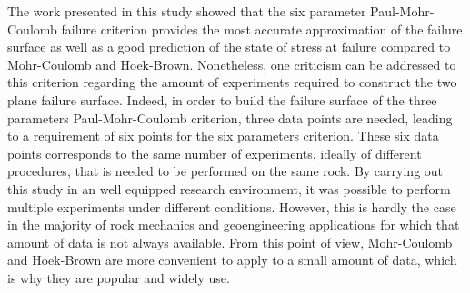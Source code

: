 The work presented in this study showed that the six parameter Paul-Mohr-Coulomb failure criterion provides the most accurate approximation of the failure surface as well as a good prediction of the state of stress at failure compared to Mohr-Coulomb and Hoek-Brown. Nonetheless, one criticism can be addressed to this criterion regarding the amount of experiments required to construct the two plane failure surface. Indeed, in order to build the failure surface of the three parameters Paul-Mohr-Coulomb criterion, three data points are needed, leading to a requirement of six points for the six parameters criterion. These six data points corresponds to the same number of experiments, ideally of different procedures, that is needed to be performed on the same rock. By carrying out this study in an well equipped research environment, it was possible to perform multiple experiments under different conditions. However, this is hardly the case in the majority of rock mechanics and geoengineering applications for which that amount of data is not always available. From this point of view, Mohr-Coulomb and Hoek-Brown are more convenient to apply to a small amount of data, which is why they are popular and widely use. 



